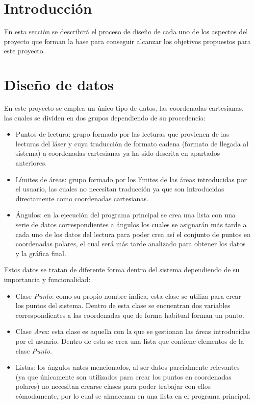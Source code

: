 
\section{Introducción}

En esta sección se describirá el proceso de diseño de cada uno de los aspectos del proyecto que forman la base para conseguir alcanzar los objetivos propuestos para este proyecto.\\

\section{Diseño de datos}

En este proyecto se emplea un único tipo de datos, las coordenadas cartesianas, las cuales se dividen en dos grupos dependiendo de su procedencia:
\begin{itemize}
	\item Puntos de lectura: grupo formado por las lecturas que provienen de las lecturas del láser y cuya traducción de formato cadena (formato de llegada al sistema) a coordenadas cartesianas ya ha sido descrita en apartados anteriores.
	\item Límites de áreas: grupo formado por los límites de las áreas introducidas por el usuario, las cuales no necesitan traducción ya que son introducidas directamente como coordenadas cartesianas.
	\item Ángulos: en la ejecución del programa principal se crea una lista con una serie de datos correspondientes a ángulos los cuales se asignarán más tarde a cada uno de los datos del lectura para poder crea así el conjunto de puntos en coordenadas polares, el cual será más tarde analizado para obtener los datos y la gráfica final.
\end{itemize}
Estos datos se tratan de diferente forma dentro del sistema dependiendo de su importancia y funcionalidad:\\
\begin{itemize}
	\item Clase \textit{Punto}: como su propio nombre indica, esta clase se utiliza para crear los puntos del sistema. Dentro de esta clase se encuentran dos variables correspondientes a las coordenadas que de forma habitual forman un punto.
	\item Clase \textit{Area}: esta clase es aquella con la que se gestionan las áreas introducidas por el usuario. Dentro de esta se crea una lista que contiene elementos de la clase \textit{Punto}.
	\item Listas: los ángulos antes mencionados, al ser datos parcialmente relevantes (ya que únicamente son utilizados para crear los puntos en coordenadas polares) no necesitan crearse clases para poder trabajar con ellos cómodamente, por lo cual se almacenan en una lista en el programa principal.
\end{itemize}

